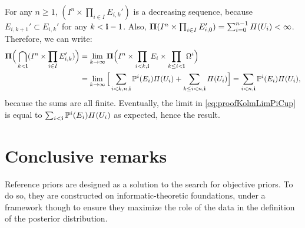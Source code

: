 For any $n\geq1$, $ %
(I^n\times\prod_{i\in I}E_{i,k}')$ is a decreasing sequence, because $E_{i,k+1}'\subset E_{i,k}'$ for any $k<\mathbf{i}-1$. 
Also, $\mathbf{\Pi}(I^n\times\prod_{i\in I}E_{i,0}')=\sum_{i=0}^{n-1}\varPi(U_i)<\infty$.
Therefore, we can write:
    \begin{align}
        \mathbf{\Pi}\Big(\bigcap_{k<\mathbf{i}}(I^n\times\prod_{i\in I}E_{i,k}')\Big) 
            &= \lim_{k\rightarrow\infty} \mathbf{\Pi}\Big(I^n\times\prod_{i<k,\mathbf{i}}E_i\times\prod_{k\leq i<\mathbf{i}}\Omega^i\Big) \\
            &= \lim_{k\rightarrow\infty} \Big[\sum_{i<k,n,\mathbf{i}}\mathbb{P}^i(E_i)\varPi(U_i)  + \sum_{k\leq i<n,\mathbf{i}}\varPi(U_i)\Big]=\sum_{i<n,\mathbf{i}}\mathbb{P}^i(E_i)\varPi(U_i),\nonumber
    \end{align}
because the sums are all finite. Eventually, the limit in \cref{eq:proofKolmLimPiCup} is equal to $\sum_{i<\mathbf{i}}\mathbb{P}^i(E_i)\varPi(U_i)$ as expected, hence the result.






\section{Conclusive remarks}\label{sec:intro-ref:conclusion}



Reference priors are designed 
as a solution to the search for objective priors.
To do so, they are constructed on informatic-theoretic foundations, under a framework though to ensure they maximize the role of the data in the definition of the posterior distribution.


